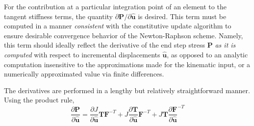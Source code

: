 For the contribution at a particular integration point of an element to the tangent stiffness terms, the quantity $\partial{\bm{P}}/\partial{\hat{\bm{u}}}$ is desired. This term must be computed in a manner \textit{consistent} with the constitutive update algorithm to ensure desirable convergence behavior of the Newton-Raphson scheme. Namely, this term should ideally reflect the derivative of the end step stress $\bm{P}$ \textit{as it is computed} with respect to incremental displacements $\hat{\bm{u}}$, as opposed to an analytic computation insensitive to the approximations made for the kinematic input, or a numerically approximated value via finite differences.

The derivatives are performed in a lengthy but relatively straightforward manner. Using the product rule,
\begin{equation}
\frac{\partial {\bm P}}{\partial \hat{{\bm u}}} = \frac{\partial J}{\partial \hat{\bm u}}{\bm T}{\bm F}^{-T} + J\frac{\partial {\bm T}}{\partial \hat{\bm u}}{\bm F}^{-T} + J{\bm T}\frac{\partial {\bm F}}{\partial \hat{\bm u}}^{-T}
\end{equation}

